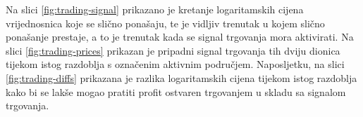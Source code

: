 \documentclass[lmodern, utf8, diplomski, numeric]{fer}
\begin{document}
  Na slici \ref{fig:trading-signal} prikazano je kretanje logaritamskih cijena vrijednosnica koje se slično ponašaju, te je vidljiv trenutak u kojem slično ponašanje prestaje, a to je trenutak kada se signal trgovanja mora aktivirati.
  Na slici \ref{fig:trading-prices} prikazan je pripadni signal trgovanja tih dviju dionica tijekom istog razdoblja s označenim aktivnim područjem.
  Naposljetku, na slici \ref{fig:trading-diffs} prikazana je razlika logaritamskih cijena tijekom istog razdoblja kako bi se lakše mogao pratiti profit ostvaren trgovanjem u skladu sa signalom trgovanja.
  \pagebreak
\end{document}
